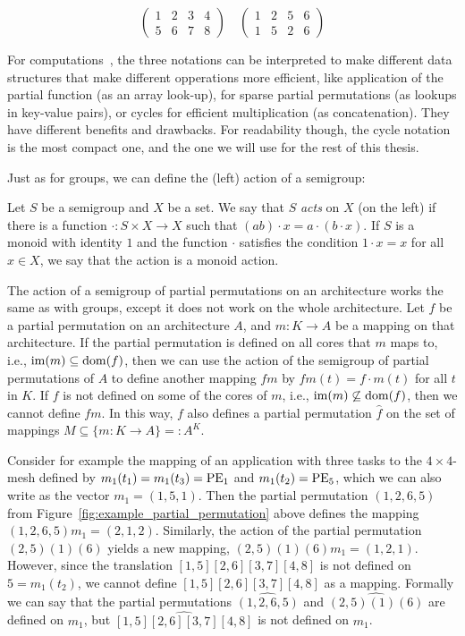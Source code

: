 \begin{equation*}
\left(
\begin{array}{llll}
1 & 2 & 3 & 4 \\
5 & 6 & 7 & 8 
\end{array}
\right)
\quad
\left(
\begin{array}{llll}
1 & 2 & 5 & 6 \\
1 & 5 & 2 & 6
\end{array}
\right)
\end{equation*}

For computations~\cite{east2019semigroups}, the three notations can be interpreted to make different data structures that make different opperations more efficient, like application of the partial function (as an array look-up), for sparse partial permutations (as lookups in key-value pairs), or cycles for efficient multiplication (as concatenation). They have different benefits and drawbacks. For readability though, the cycle notation is the most compact one, and the one we will use for the rest of this thesis.

Just as for groups, we can define the (left) action of a semigroup:
\begin{defn}
Let $S$ be a semigroup and $X$ be a set. We say that $S$ \emph{acts} on $X$ (on the left) if there is a function $\cdot : S \times X \rightarrow X$ such that $(ab) \cdot x = a \cdot (b \cdot x)$. If $S$ is a monoid with identity $1$ and the function $\cdot$ satisfies the condition $1 \cdot x = x$ for all $x \in X$, we say that the action is a monoid action.
\end{defn}

The action of a semigroup of partial permutations on an architecture works the same as with groups, except it does not work on the whole architecture.
Let $f$ be a partial permutation on an architecture $A$, and $m : K \rightarrow A$ be a mapping on that architecture.
If the partial permutation is defined on all cores that $m$ maps to, i.e., $\operatorname{im}(m) \subseteq \operatorname{dom}(f)$, then we can use the action of the semigroup of partial permutations of $A$ to define another mapping $fm$ by $fm(t) = f \cdot m(t)$ for all $t$ in $K$.
If $f$ is not defined on some of the cores of $m$, i.e., $\operatorname{im}(m) \not \subseteq \operatorname{dom}(f)$, then we cannot define $fm$. In this way, $f$ also defines a partial permutation $\hat f$ on the set of mappings $M \subseteq \{ m : K \rightarrow A \} =: A^K$.

Consider for example the mapping of an application with three tasks to the $4 \times 4$-mesh defined by $m_1(t_1) = m_1(t_3) = \operatorname{PE}_1$ and $m_1(t_2) = \operatorname{PE}_5$, which we can also write as the vector $m_1 = (1,5,1)$.
Then the partial permutation $(1,2,6,5)$ from Figure~\ref{fig:example_partial_permutation} above defines the mapping $(1,2,6,5)m_1 = (2,1,2)$.
Similarly, the action of the partial permutation $(2,5)(1)(6)$ yields a new mapping, $(2,5)(1)(6)m_1 = (1,2,1)$.
However, since the translation $[1,5][2,6][3,7][4,8]$ is not defined on $5 = m_1(t_2)$, we cannot define $[1,5][2,6][3,7][4,8]$ as a mapping.
Formally we can say that the partial permutations $\widehat{(1,2,6,5)}$ and $\widehat{(2,5)(1)(6)}$ are defined on $m_1$, but $\widehat{[1,5][2,6][3,7][4,8]}$ is not defined on $m_1$.

